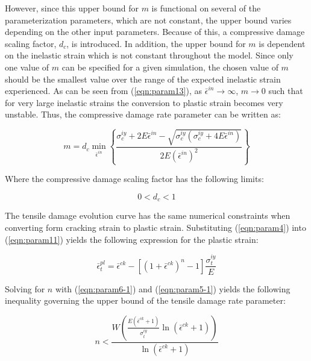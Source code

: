 However, since this upper bound for $m$ is functional on several of the parameterization parameters, which are not constant, the upper bound varies depending on the other input parameters. Because of this, a compressive damage scaling factor, $d_c$, is introduced. In addition, the upper bound for $m$ is dependent on the inelastic strain which is not constant throughout the model. Since only one value of $m$ can be specified for a given simulation, the chosen value of $m$ should be the smallest value over the range of the expected inelastic strain experienced. As can be seen from (\ref{eqn:param13}), as $\bar{\epsilon}^{in} \rightarrow \infty$, $m\rightarrow0$ such that for very large inelastic strains the conversion to plastic strain becomes very unstable. Thus, the compressive damage rate parameter can be written as:

\begin{equation}
m=d_{c}\min_{\bar{\epsilon}^{in}}\left\{\frac{\sigma_{c}^{iy}+2E\bar{\epsilon}^{in}-\sqrt{\sigma_{c}^{iy}\left(\sigma_{c}^{iy}+4E\bar{\epsilon}^{in}\right)}}{2E\left(\bar{\epsilon}^{in}\right)^{2}}\right\}
\label{eqn:param14}
\end{equation}

Where the compressive damage scaling factor has the following limits:

\begin{equation}
0<d_{c}<1\label{eqn:param15}
\end{equation}

The tensile damage evolution curve has the same numerical constraints when converting form cracking strain to plastic strain. Substituting (\ref{eqn:param4}) into (\ref{eqn:param11}) yields the following expression for the plastic strain:

\begin{equation}
\bar{\epsilon}_{t}^{pl}=\bar{\epsilon}^{ck}-\left[\left(1+\bar{\epsilon}^{ck}\right)^{n}-1\right]\frac{\sigma_{t}^{iy}}{E}\label{eqn:param5-1}
\end{equation}

Solving for $n$ with (\ref{eqn:param6-1}) and (\ref{eqn:param5-1}) yields the following inequality governing the upper bound of the tensile damage rate parameter:

\begin{equation}
n<\frac{W\left(\frac{E\left(\bar{\epsilon}^{ck}+1\right)}{\sigma_{t}^{iy}}\ln\left(\bar{\epsilon}^{ck}+1\right)\right)}{\ln\left(\bar{\epsilon}^{ck}+1\right)}\label{eqn:param7}
\end{equation}

